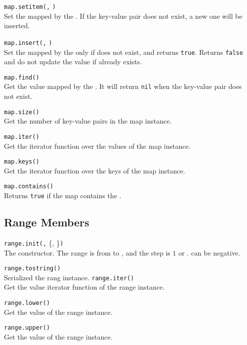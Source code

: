 \hangpar \texttt{map.setitem(}\texttt{,} \texttt{)}\\
Set the  mapped by the . If the key-value pair does not exist, a new one will be inserted.

\hangpar \texttt{map.insert(}\texttt{,} \texttt{)}\\
Set the  mapped by the  only if  does not exist, and returns \texttt{true}. Returns \texttt{false} and do not update the value if  already exists.

\hangpar \texttt{map.find(}\texttt{)}\\
Get the value mapped by the . It will return \texttt{nil} when the key-value pair does not exist.

\hangpar \texttt{map.size()}\\
Get the number of key-value pairs in the map instance.

\hangpar \texttt{map.iter()}\\
Get the iterator function over the values of the map instance. 

\hangpar \texttt{map.keys()}\\
Get the iterator function over the keys of the map instance. 

\hangpar \texttt{map.contains(}\texttt{)}\\
Returns \texttt{true} if the map contains the .

\subsection*{Range Members}

\hangpar \texttt{range.init(}\texttt{,} \{, \}\texttt{)}\\
The constructor. The range is from  to , and the step is $1$ or .  can be negative.

\hangpar \texttt{range.tostring()}\\
Serialized the rang instance.
\hangpar \texttt{range.iter()}\\
Get the value iterator function of the range instance. 

\hangpar \texttt{range.lower()}\\
Get the  value of the range instance.

\hangpar \texttt{range.upper()}\\
Get the  value of the range instance.

